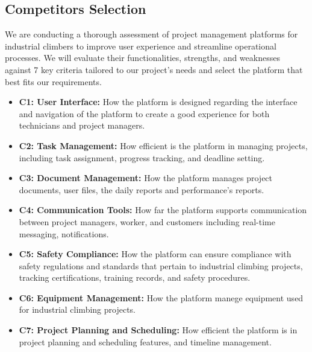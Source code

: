 \subsection{Competitors Selection}
We are conducting a thorough assessment of project management platforms for industrial climbers to improve user experience and streamline operational processes. We will evaluate their functionalities, strengths, and weaknesses against 7 key criteria tailored to our project's needs and select the platform that best fits our requirements.

\begin{itemize}
    \item \textbf{C1: User Interface:} How the platform is designed regarding the interface and navigation of the platform to create a good experience for both technicians and project managers.

    \item \textbf{C2: Task Management:} How efficient is the platform in managing projects, including task assignment, progress tracking, and deadline setting.

    \item \textbf{C3: Document Management:} How the platform manages project documents, user files, the daily reports and performance’s reports.
    \item \textbf{C4: Communication Tools:} How far the platform supports communication between project managers, worker, and customers including real-time messaging, notifications.

    \item \textbf{C5: Safety Compliance:} How the platform can ensure compliance with safety regulations and standards that pertain to industrial climbing projects, tracking certifications, training records, and safety procedures.
    \item \textbf{C6: Equipment Management:} How the platform manege equipment used for industrial climbing projects.
    \item \textbf{C7: Project Planning and Scheduling:} How efficient the platform is in project planning and scheduling features, and timeline management.
\end{itemize}

